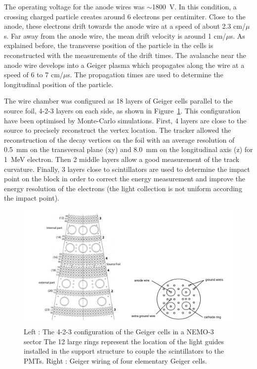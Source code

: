 \documentclass[main.tex]{subfiles}
\begin{document}
\NI The operating voltage for the anode wires was $\sim$1800~V. In this condition, a crossing charged particle creates around 6 electrons per centimiter. Close to the anode, these electrons drift towards the anode wire at a speed of about 2.3 cm/$\mu$s. Far away from the anode wire, the mean drift velocity is around 1 cm/$\mu$s. As explained before, the transverse position of the particle in the cells is reconstructed with the measurements of the drift times. The avalanche near the anode wire develops into a Geiger plasma which propagates along the wire at a speed of 6 to 7 cm/$\mu$s. The propagation times are used to determine the longitudinal position of the particle.


\bigskip


\NI The wire chamber was configured as 18 layers of Geiger cells parallel to the source foil, 4-2-3 layers on each side, as shown in Figure~\ref{TrackerNEMOView}. This configuration have been optimised by Monte-Carlo simulations. First, 4 layers are close to the source to precisely reconstruct the vertex location. The  tracker  allowed the reconstruction of the decay vertices on the foil with  an  average  resolution  of  0.5~mm  on  the  transversal plane (xy) and 8.0~mm on the longitudinal axis (z) for 1~MeV electron. Then 2 middle layers allow a good measurement of the track curvature. Finally, 3 layers close to scintillators are used to determine the impact point on the block in order to correct the energy measurement and improve the energy resolution of the electrons (the light collection is not uniform according the impact point).   




\begin{figure}[h!]
\begin{center}
\includegraphics[scale=0.30]{pictures/Chap3/TrackerNEMOView.png}
\caption{Left : The 4-2-3 configuration of the Geiger cells in a NEMO-3 sector The 12 large rings represent the location of the light guides installed in the support structure to couple the scintillators to the PMTs. Right : Geiger
wiring of four elementary Geiger cells.}
\label{TrackerNEMOView}
\end{center}
\end{figure}
\end{document}
